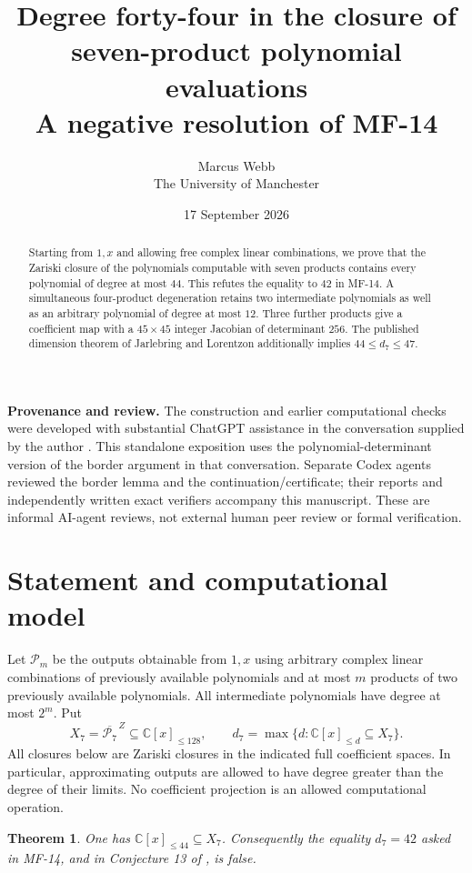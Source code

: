 \documentclass[11pt]{article}
\title{Degree forty-four in the closure of seven-product polynomial evaluations\\
\large A negative resolution of MF-14}
\author{Marcus Webb\\The University of Manchester}
\date{17 September 2026}
\newtheorem{theorem}{Theorem}
\newcommand{\C}{\mathbb C}
\newcommand{\V}[1]{\C[x]_{\le #1}}
\newcommand{\cl}{\overline}
\begin{document}
\maketitle
\begin{abstract}
Starting from $1,x$ and allowing free complex linear combinations, we prove
that the Zariski closure of the polynomials computable with seven products
contains every polynomial of degree at most $44$. This refutes the equality
to $42$ in MF-14. A simultaneous four-product degeneration retains two
intermediate polynomials as well as an arbitrary polynomial of degree at most
$12$. Three further products give a coefficient map with a $45\times45$
integer Jacobian of determinant $256$. The published dimension theorem of
Jarlebring and Lorentzon additionally implies $44\le d_7\le47$.
\end{abstract}

\noindent\textbf{Provenance and review.}
The construction and earlier computational checks were developed with
substantial ChatGPT assistance in the conversation supplied by the author
\cite{chat}. This standalone exposition uses the polynomial-determinant
version of the border argument in that conversation. Separate Codex agents
reviewed the border lemma and the continuation/certificate; their reports and
independently written exact verifiers accompany this manuscript. These are
informal AI-agent reviews, not external human peer review or formal verification.

\section{Statement and computational model}
Let $\mathcal P_m$ be the outputs obtainable from $1,x$ using arbitrary
complex linear combinations of previously available polynomials and at most
$m$ products of two previously available polynomials. All intermediate
polynomials have degree at most $2^m$. Put
\[
 X_7=\cl{\mathcal P_7}^{\,Z}\subseteq\V{128},\qquad
 d_7=\max\{d:\V d\subseteq X_7\}.
\]
All closures below are Zariski closures in the indicated full coefficient
spaces. In particular, approximating outputs are allowed to have degree
greater than the degree of their limits. No coefficient projection is an
allowed computational operation.

\begin{theorem}\label{thm:main}
One has $\V{44}\subseteq X_7$. Consequently the equality $d_7=42$ asked
in MF-14, and in Conjecture 13 of \cite{JL}, is false.
\end{theorem}
\end{document}
